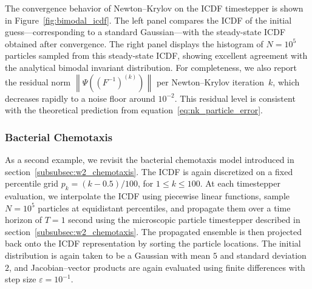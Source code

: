 \documentclass{article}
\newcommand{\norm}[1]{\left\lVert#1\right\rVert}
\begin{document}
The convergence behavior of Newton–Krylov on the ICDF timestepper is shown in Figure~\ref{fig:bimodal_icdf}. The left panel compares the ICDF of the initial guess—corresponding to a standard Gaussian—with the steady-state ICDF obtained after convergence. The right panel displays the histogram of $N = 10^5$ particles sampled from this steady-state ICDF, showing excellent agreement with the analytical bimodal invariant distribution. For completeness, we also report the residual norm $\norm{\Psi\left((F^{-1})^{(k)}\right)}$ per Newton–Krylov iteration~$k$, which decreases rapidly to a noise floor around $10^{-2}$. This residual level is consistent with the theoretical prediction from equation~\eqref{eq:nk_particle_error}.

\subsubsection{Bacterial Chemotaxis}
As a second example, we revisit the bacterial chemotaxis model introduced in section~\ref{subsubsec:w2_chemotaxis}. The ICDF is again discretized on a fixed percentile grid $p_k = (k - 0.5)/100$, for $1 \leq k \leq 100$. At each timestepper evaluation, we interpolate the ICDF using piecewise linear functions, sample $N = 10^5$ particles at equidistant percentiles, and propagate them over a time horizon of $T = 1$ second using the microscopic particle timestepper described in section~\ref{subsubsec:w2_chemotaxis}. The propagated ensemble is then projected back onto the ICDF representation by sorting the particle locations. The initial distribution is again taken to be a Gaussian with mean $5$ and standard deviation $2$, and Jacobian–vector products are again evaluated using finite differences with step size $\varepsilon = 10^{-1}$.
\end{document}
